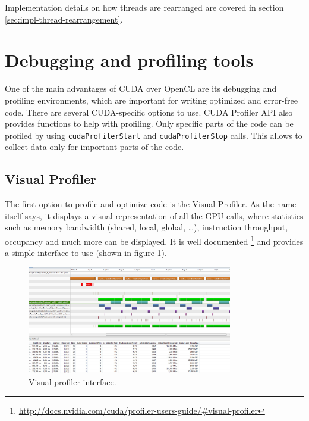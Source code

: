 Implementation details on how threads are rearranged are covered in section \ref{sec:impl-thread-rearrangement}.

\section{Debugging and profiling tools}\label{sec:debugging-and-profiling}

One of the main advantages of CUDA over OpenCL are its debugging and profiling environments, which are important for writing optimized and error-free code. There are several CUDA-specific options to use. CUDA Profiler API also provides functions to help with profiling. Only specific parts of the code can be profiled by using \verb|cudaProfilerStart| and \verb|cudaProfilerStop| calls. This allows to collect data only for important parts of the code.

\subsection{Visual Profiler}\label{subsec:proftools-visual-profiler}

The first option to profile and optimize code is the Visual Profiler. As the name itself says, it displays a visual representation of all the GPU calls, where statistics such as memory bandwidth (shared, local, global, \dots), instruction throughput, occupancy and much more can be displayed. It is well documented \footnote{\url{http://docs.nvidia.com/cuda/profiler-users-guide/\#visual-profiler}} and provides a simple interface to use (shown in figure \ref{fig:visual-profiler}). 

\begin{figure}[ht]
	\begin{center}
	\includegraphics[width=0.8\textwidth]{fig/visual_profiler.jpg}
	\caption{Visual profiler interface.}
	\label{fig:visual-profiler}
	\end{center}
\end{figure}


